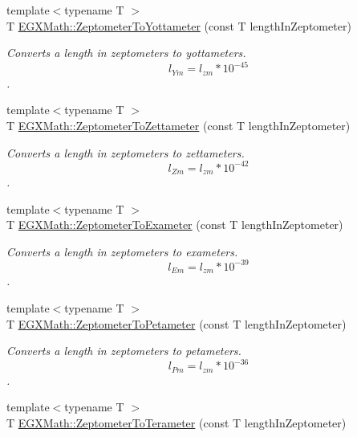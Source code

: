 \begin{DoxyCompactItemize}
{\footnotesize template$<$typename T $>$ }\\T \mbox{\hyperlink{group___e_g_x_math-_conversions-_length_conversions-_s_i-_zeptometer-_s_i_gaac70660b1e189b20afff8dcd02dfb105}{E\+G\+X\+Math\+::\+Zeptometer\+To\+Yottameter}} (const T length\+In\+Zeptometer)
\begin{DoxyCompactList}\small\item\em Converts a length in zeptometers to yottameters. \[ l_{Ym}=l_{zm} * 10^{-45} \]. \end{DoxyCompactList}\item 
{\footnotesize template$<$typename T $>$ }\\T \mbox{\hyperlink{group___e_g_x_math-_conversions-_length_conversions-_s_i-_zeptometer-_s_i_ga73c5c0469d7d2aa9947293128c7aed73}{E\+G\+X\+Math\+::\+Zeptometer\+To\+Zettameter}} (const T length\+In\+Zeptometer)
\begin{DoxyCompactList}\small\item\em Converts a length in zeptometers to zettameters. \[ l_{Zm}=l_{zm} * 10^{-42} \]. \end{DoxyCompactList}\item 
{\footnotesize template$<$typename T $>$ }\\T \mbox{\hyperlink{group___e_g_x_math-_conversions-_length_conversions-_s_i-_zeptometer-_s_i_ga28d70f8fb1a2876c4c8553348c78925d}{E\+G\+X\+Math\+::\+Zeptometer\+To\+Exameter}} (const T length\+In\+Zeptometer)
\begin{DoxyCompactList}\small\item\em Converts a length in zeptometers to exameters. \[ l_{Em}=l_{zm} * 10^{-39} \]. \end{DoxyCompactList}\item 
{\footnotesize template$<$typename T $>$ }\\T \mbox{\hyperlink{group___e_g_x_math-_conversions-_length_conversions-_s_i-_zeptometer-_s_i_ga8d63077fa2d65649004804647da5af60}{E\+G\+X\+Math\+::\+Zeptometer\+To\+Petameter}} (const T length\+In\+Zeptometer)
\begin{DoxyCompactList}\small\item\em Converts a length in zeptometers to petameters. \[ l_{Pm}=l_{zm} * 10^{-36} \]. \end{DoxyCompactList}\item 
{\footnotesize template$<$typename T $>$ }\\T \mbox{\hyperlink{group___e_g_x_math-_conversions-_length_conversions-_s_i-_zeptometer-_s_i_ga442c02caa8b630c3f90675191b22bca5}{E\+G\+X\+Math\+::\+Zeptometer\+To\+Terameter}} (const T length\+In\+Zeptometer)

\end{DoxyCompactItemize}
